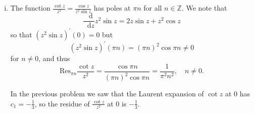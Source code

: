 \documentclass{article}
\newcommand\Res{\mathrm{Res}}
\newcommand\dif{\mathop{}\!\mathrm{d}}
\begin{document}
\begin{Answer}
  \begin{enumerate}[(i)]
    \item{
      The function $\frac{\cot z}{z^2} = \frac{\cos z}{z^2 \sin z}$
      has poles at $\pi n$ for all $n \in \mathbb{Z}$. We note that
      $$
        \frac{\dif}{\dif z}
        z^2 \sin z
      = 2z \sin z + z^2 \cos z
      $$
      so that $(z^2 \sin z)^\prime(0) = 0$ but
      $$
        (z^2 \sin z)^\prime(\pi n)
      = (\pi n)^2 \cos \pi n
      \neq 0
      $$
      for $n \neq 0$, and thus
      $$
        \Res_{\pi n}
          \frac{\cot z}{z^2}
      = \frac{\cos \pi n}
             {(\pi n)^2 \cos \pi n}
      = \frac{1}{\pi^2 n^2}, \quad n \neq 0.
      $$

      In the previous problem we saw that the Laurent expansion of
      $\cot z$ at 0 has $c_1 = -\frac{1}{3}$, so the residue of
      $\frac{\cot z}{z^2}$ at 0 is $-\frac{1}{3}$.

}
\end{enumerate}
\end{Answer}
\end{document}

